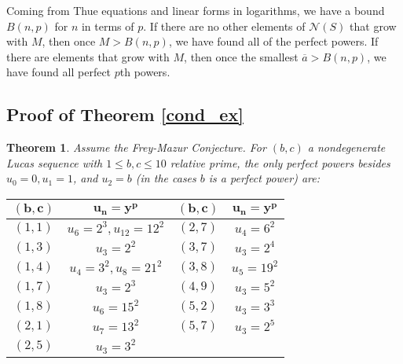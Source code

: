 \documentclass[12pt]{amsart}
\newtheorem{thm}{Theorem}[section]
\theoremstyle{definition}
\def\N{{\mathcal N}}
\renewcommand{\bar}{\overline}
\begin{document}
Coming from Thue equations and linear forms in logarithms, we have a bound $B(n,p)$ for $n$ in terms of $p$.  If there are no other elements of $\N(S)$ that grow with $M$, then once $M >B(n,p)$, we have found all of the perfect powers.  If there are elements that grow with $M$, then once the smallest $\bar{a} > B(n,p)$, we have found all perfect $p$th powers.






\subsection{Proof of Theorem \ref{cond_ex}}

\begin{thm}\label{cond_ex_inplace}
Assume the Frey-Mazur Conjecture.  For $(b,c)$ a nondegenerate Lucas sequence with $1 \leq b,c \leq 10$ relative prime, the only perfect powers besides $u_0=0,u_1=1$, and $u_2 = b$ (in the cases $b$ is a perfect power) are:
\begin{center}
\begin{tabular}{c | c || c | c}
$\mathbf{(b,c)}$ & $\mathbf{u_n=y^p}$ & $\mathbf{(b,c)}$ & $\mathbf{u_n = y^p}$ \\ \hline
$(1,1)$ & $u_6 = 2^3, u_{12} = 12^2$ & $(2,7)$ & $u_4 = 6^2$ \\
$(1,3)$ & $u_3 = 2^2$ & $(3,7)$ & $u_3 = 2^4$ \\
$(1,4)$ & $u_4 = 3^2, u_8 = 21^2$ & $(3,8)$ & $u_5 = 19^2$ \\
$(1,7)$ & $u_3 = 2^3$ & $(4,9)$ & $u_3 = 5^2$ \\
$(1,8)$ & $u_6 = 15^2$ & $(5,2)$ & $u_3 = 3^3$ \\
$(2,1)$ &  $u_7 = 13^2$ & $(5,7)$ & $u_3 = 2^5$ \\
$(2,5)$ & $u_3 = 3^2$ \\
\end{tabular}
\end{center}
\end{thm}







{}

\end{document}
